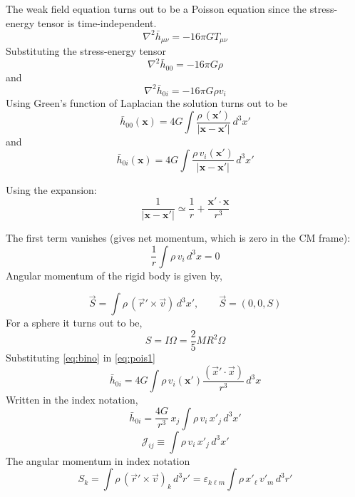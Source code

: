 \documentclass[12pt, a4paper]{article}
\theoremstyle{plain}
\theoremstyle{definition}
\theoremstyle{remark}
\begin{document}
The weak field equation turns out to be a Poisson equation since the stress-energy tensor is time-independent.
\begin{equation}
    \nabla^2 \bar{h}_{\mu\nu} = -16\pi G T_{\mu\nu}
\end{equation}
Substituting the stress-energy tensor 
\begin{equation}
    \nabla^2 \bar h_{00}=-16\pi G\rho
\end{equation}
and 
\begin{equation}
    \nabla^2 \bar h_{0i}=-16\pi G\rho v_i
\end{equation}
Using Green's function of Laplacian the solution turns out to be
\begin{equation}
    \bar h_{00}(\mathbf{x}) = 4G \int \frac{\rho\, (\mathbf{x}')}{|\mathbf{x} - \mathbf{x}'|}\, d^3x'
\end{equation}
and
\begin{equation}
   \bar h_{0i}(\mathbf{x}) = 4G \int \frac{\rho\, v_i(\mathbf{x}')}{|\mathbf{x} - \mathbf{x}'|}\, d^3x'
    \label{eq:pois1}
\end{equation}

Using the expansion:
\begin{equation}
    \frac{1}{|\mathbf{x} - \mathbf{x}'|} \simeq \frac{1}{r} + \frac{\mathbf{x}' \cdot \mathbf{x}}{r^3}
    \label{eq:bino}
\end{equation}

The first term vanishes (gives net momentum, which is zero in the CM frame):
\begin{equation}
    \frac{1}{r}\int \rho\, v_i\, d^3x = 0
\end{equation}
Angular momentum of the rigid body is given by,

\begin{equation}
    \vec{S} = \int \rho\,(\vec{r}' \times \vec{v})\, d^3x', \qquad \vec{S} = (0,0,S)
\end{equation}
For a sphere it turns out to be,
\begin{equation}
    S = I\Omega = \frac{2}{5}MR^2\Omega
\end{equation}
Substituting \eqref{eq:bino}  in \eqref{eq:pois1} 
\begin{equation}
   \bar h_{0i} = 4G \int \rho\, v_i(\mathbf{x}') \frac{(\vec{x}' \cdot \vec{x})}{r^3}\, d^3x
\end{equation}
Written in the index notation,
\begin{equation}
  \bar  h_{0i} = \frac{4G}{r^3}\, x_j \int \rho\, v_i\, x'_j\, d^3x'
\end{equation} 
\begin{equation}
    \mathcal{J}_{ij} \equiv \int \rho\, v_i\, x'_j\, d^3x'
\end{equation}
The angular momentum in index notation
\begin{equation}
    S_k = \int \rho\,(\vec{r}' \times \vec{v})_k\, d^3r' = \varepsilon_{k\ell m} \int \rho\, x'_\ell\, v'_m\, d^3r'
\end{equation}
\end{document}
